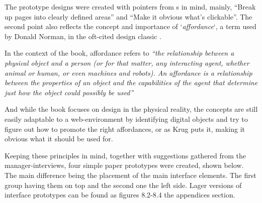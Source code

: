 {  



  The prototype designs were created with pointers from
  \citeauthor{citeDonMakeMeThink}s
  \cite{citeDonMakeMeThink} in mind, mainly,
  ``Break up pages into clearly defined areas'' and ``Make it obvious what's
  clickable''. The second point also reflects the concept and importance of
  `\textit{affordance}`, a term used by Donald Norman, in the oft-cited design classic
  \cite{citeTheDesignOfEverydayThings}.

  In the context of the book, affordance refers to
  \textit{%
  ``the relationship between a physical object
  and a person (or for that matter, any interacting agent, whether animal or
  human, or even machines and robots). An affordance is a relationship
  between the properties of an object and the capabilities of the agent that
  determine just how the object could possibly be used''
  }\cite[p. 11]{citeTheDesignOfEverydayThings}

  And while the book focuses on design in the physical reality, the concepts
  are still easily adaptable to a web-environment by identifying digital objects and
  try to figure out how to promote the right affordances, or as Krug puts it, making
  it obvious what it should be used for.

  Keeping these principles in mind, together with suggestions
  gathered from the manager-interviews, four simple paper prototypes were
  created, shown below. The main difference being the placement of the main
  interface elements. The first group having them on top and the second one the
  left side. Lager versions of interface prototypes can be found as figures
  8.2-8.4 the appendices section.

}
